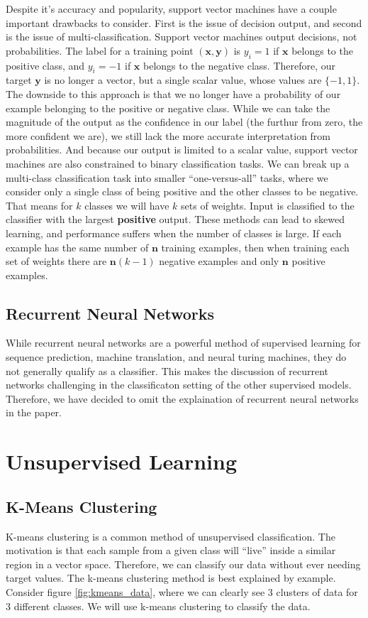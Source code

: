 \documentclass[11pt]{article}
\newcommand{\mcolor}[2][red]{{\color{#1}\textbf{#2}}}
\begin{document}
Despite it's accuracy and popularity, support vector machines have a couple important drawbacks to consider. First is the issue of decision output, and second is the issue of multi-classification. Support vector machines output decisions, not probabilities. The label for a training point $(\mathbf{x},\mathbf{y})$ is $y_{i} = 1$ if $\mathbf{x}$ belongs to the positive class, and $y_{i} = -1$ if $\mathbf{x}$ belongs to the negative class. Therefore, our target $\mathbf{y}$ is no longer a vector, but a single scalar value, whose values are $\{-1,1\}$. The downside to this approach is that we no longer have a probability of our example belonging to the positive or negative class. While we can take the magnitude of the output as the confidence in our label (the furthur from zero, the more confident we are), we still lack the more accurate interpretation from probabilities. And because our output is limited to a scalar value, support vector machines are also constrained to binary classification tasks. We can break up a multi-class classification task into smaller ``one-versus-all'' tasks, where we consider only a single class of being positive and the other classes to be negative. That means for $k$ classes we will have $k$ sets of weights. Input is classified to the classifier with the largest \mcolor{positive} output. These methods can lead to skewed learning, and performance suffers when the number of classes is large. If each example has the same number of $\mathbf{n}$ training examples, then when training each set of weights there are $\mathbf{n}(k - 1)$ negative examples and only $\mathbf{n}$ positive examples.


\subsection{Recurrent Neural Networks}
While recurrent neural networks are a powerful method of supervised learning for sequence prediction, machine translation, and neural turing machines, they do not generally qualify as a classifier. This makes the discussion of recurrent networks challenging in the classificaton setting of the other supervised models. Therefore, we have decided to omit the explaination of recurrent neural networks in the paper.

\section{Unsupervised Learning}

\subsection{K-Means Clustering}
K-means clustering is a common method of unsupervised classification. The motivation is that each sample from a given class will ``live'' inside a similar region in a vector space. Therefore, we can classify our data without ever needing target values. The k-means clustering method is best explained by example. Consider figure \ref{fig:kmeans_data}, where we can clearly see $3$ clusters of data for $3$ different classes. We will use k-means clustering to classify the data.
\end{document}

